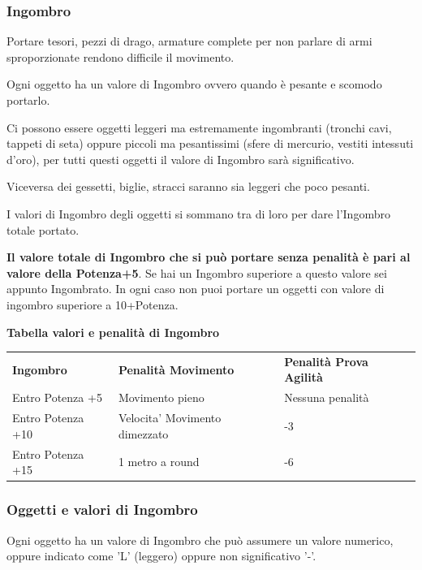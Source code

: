 \documentclass[a4paper,11pt,twoside,openany]{book}
\begin{document}
{\label{capacituxe0-di-carico-e-trasporto-ingombro}

\subsubsection{Ingombro}

Portare tesori, pezzi di drago, armature complete per non parlare di armi sproporzionate rendono difficile il movimento.

Ogni oggetto ha un valore di Ingombro ovvero quando è pesante e scomodo portarlo.


Ci possono essere oggetti leggeri ma estremamente ingombranti (tronchi cavi, tappeti di seta) oppure piccoli ma pesantissimi (sfere di mercurio, vestiti intessuti d'oro), per tutti questi oggetti il valore di Ingombro sarà significativo.


Viceversa dei gessetti, biglie, stracci saranno sia leggeri che poco pesanti.

I valori di Ingombro degli oggetti si sommano tra di loro per dare l'Ingombro totale portato.

\textbf{Il valore totale di Ingombro che si può portare senza penalità è pari al valore della Potenza+5}.
Se hai un Ingombro superiore a questo valore sei appunto Ingombrato. In ogni caso non puoi portare un oggetti con valore di ingombro superiore a 10+Potenza.

\bigskip

\textbf{Tabella valori e penalità di Ingombro}

\medskip

\begin{tabular}{lll}
	\hline
	\textbf{Ingombro} & \textbf{ Penalità Movimento}&  \textbf{Penalità Prova Agilità}\\
	Entro Potenza +5&  Movimento pieno& Nessuna penalità \\
	Entro Potenza +10& Velocita' Movimento dimezzato& -3 \\
	Entro Potenza +15&  1 metro a round & -6 \\
\end{tabular}

\subsubsection{Oggetti e valori di Ingombro}

Ogni oggetto ha un valore di Ingombro che può assumere un valore numerico, oppure indicato come 'L' (leggero) oppure non significativo '-'.

}
\end{document}
